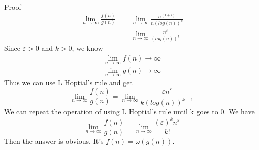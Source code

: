 \begin{parts}
    \begin{solution} \\
        Proof
        \begin{equation}
            \begin{aligned}
                \lim_{n \to \infty} \frac{f(n)}{g(n)} = & \lim_{n \to \infty} \frac{n^(1 + \varepsilon)}{n(log(n))^k} \\
                =                                       & \lim_{n \to \infty} \frac{n^\varepsilon}{(log(n))^k}
            \end{aligned}
        \end{equation}
        Since $\varepsilon > 0$ and $k > 0$, we know
        \begin{equation}
            \begin{aligned}
                \lim_{n \to \infty}f(n) \to \infty \\
                \lim_{n \to \infty}g(n) \to \infty
            \end{aligned}
        \end{equation}
        Thus we can use L Hoptial's rule and get
        \begin{equation}
            \lim_{n \to \infty} \frac{f(n)}{g(n)} = \lim_{n \to \infty} \frac{\varepsilon n^\varepsilon}{k(log(n))^{k-1}}
        \end{equation}
        We can repeat the operation of using L Hoptial's rule until k goes to 0. We have
        \begin{equation}
            \lim_{n \to \infty} \frac{f(n)}{g(n)} = \lim_{n \to \infty} \frac{(\varepsilon)^k n^\varepsilon}{k!}
        \end{equation}
        Then the answer is obvious. It's $f(n) = \omega(g(n))$.
    \end{solution}
\end{parts}

